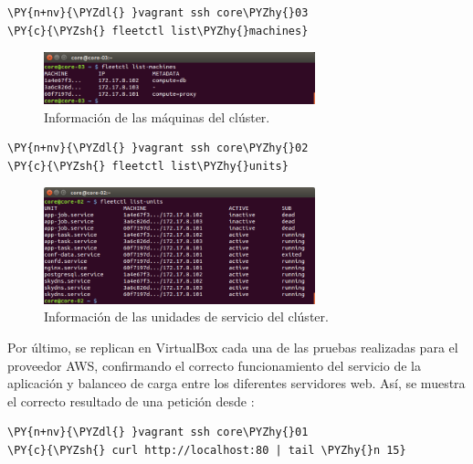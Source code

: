 \begin{framed_shaded}
\begin{Verbatim}[fontsize=\relsize{-2.5},fontseries=b,commandchars=\\\{\}]
\PY{n+nv}{\PYZdl{} }vagrant ssh core\PYZhy{}03
\PY{c}{\PYZsh{} fleetctl list\PYZhy{}machines}
\end{Verbatim}
\end{framed_shaded}

\begin{figure}[H]
\centering
\includegraphics[width=0.7\textwidth]{images/figures/machines-vbox.png}
\caption{Información de las máquinas del clúster.}
\end{figure}

\begin{framed_shaded}
\begin{Verbatim}[fontsize=\relsize{-2.5},fontseries=b,commandchars=\\\{\}]
\PY{n+nv}{\PYZdl{} }vagrant ssh core\PYZhy{}02
\PY{c}{\PYZsh{} fleetctl list\PYZhy{}units}
\end{Verbatim}
\end{framed_shaded}

\begin{figure}[H]
\centering
\includegraphics[width=0.7\textwidth]{images/figures/units-vbox.png}
\caption{Información de las unidades de servicio del clúster.}
\end{figure}

Por último, se replican en VirtualBox cada una de las pruebas realizadas para el proveedor AWS, confirmando el correcto funcionamiento del servicio de la aplicación y balanceo de carga entre los diferentes servidores web. Así, se muestra el correcto resultado de una petición desde :

\begin{framed_shaded}
\begin{Verbatim}[fontsize=\relsize{-2.5},fontseries=b,commandchars=\\\{\}]
\PY{n+nv}{\PYZdl{} }vagrant ssh core\PYZhy{}01
\PY{c}{\PYZsh{} curl http://localhost:80 | tail \PYZhy{}n 15}
\end{Verbatim}
\end{framed_shaded}

